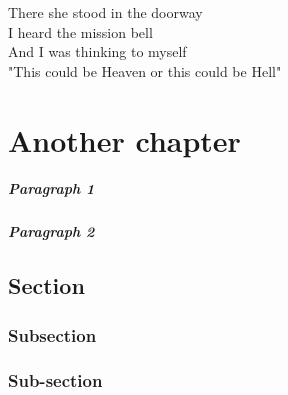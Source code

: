 \begin{savequote}[120mm]
There she stood in the doorway \\
I heard the mission bell \\
And I was thinking to myself \\
"This could be Heaven or this could be Hell"
\end{savequote}


\chapter{Another chapter}
\label{chapter2}
\thispagestyle{fancy}

\textit{\lipsum[1]}


\paragraph{Paragraph 1}

\lipsum[2]



\paragraph{Paragraph 2}

\lipsum[3]


\section{Section}

\lipsum[4-7]

\subsection{Subsection}

\lipsum[4-7]

\subsection{Sub-section}

\lipsum[4-7]
